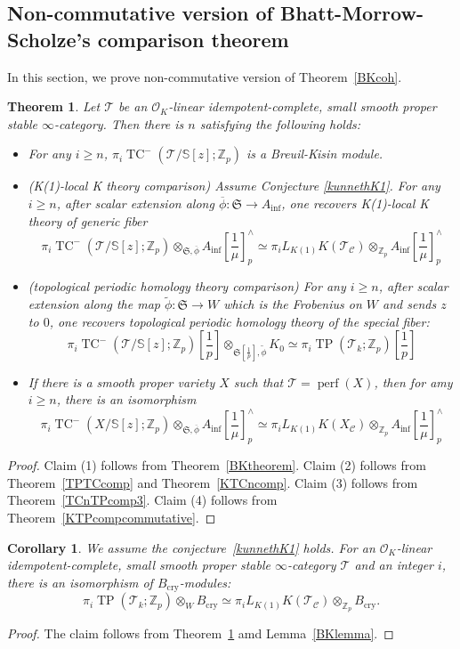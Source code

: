 \documentclass[11pt]{amsart}
\newcommand{\Z}{\mathbb{Z}}
\newcommand{\sO}{\mathcal{O}}
\newcommand{\sT}{\mathcal{T}}
\newcommand{\bS}{\mathbb{S}}
\newcommand{\perf}{\operatorname{perf}}
\newcommand{\LK}{{L_{K(1)}}}
\newcommand{\TP}{\operatorname{TP}}
\newcommand{\TCn}{\operatorname{TC}^{-}}
\newcommand{\ol}{\overline}
\newcommand{\Bcry}{B_{\operatorname{cry}}}
\newcommand{\Ainf}{A_{\operatorname{inf}}}
\newcommand{\Cu}{\mathcal{C}}
\newcommand{\mS}{\mathfrak{S}}
\newcounter{spec}
\newtheorem{thm}[lemma]{Theorem}
\newtheorem{cor}[lemma]{Corollary}
\theoremstyle{definition}
\theoremstyle{remark}
\numberwithin{equation}{section}
\begin{document}
\subsection{Non-commutative version of Bhatt-Morrow-Scholze's comparison theorem} In this section, we prove non-commutative version of Theorem~\ref{BKcoh}.
\begin{thm}\label{NCBMS}
  Let $\sT$ be an $\sO_K$-linear idempotent-complete, small smooth proper stable $\infty$-category. Then there is $n$ satisfying the following holds:
 \begin{itemize}
   \item[(1)] For any $i\geq n$, $\pi_i \TCn(\sT/\bS[z];\Z_p)$ is a Breuil-Kisin module.
   \item[(2)] (K(1)-local K theory comparison) Assume Conjecture \ref{kunnethK1}. For any $i\geq n$, after scalar extension along $\ol{\phi}:\mS\to \Ainf$, one recovers K(1)-local K theory of generic fiber
   \[
   \pi_i \TCn(\sT/\bS[z];\Z_p) \otimes_{\mS,\ol{\phi}} \Ainf[\frac{1}{\mu}]^{\wedge}_p \simeq \pi_i\LK K(\sT_{\Cu})\otimes_{\Z_p} \Ainf[\frac{1}{\mu}]^{\wedge}_p
   \]
   \item[(3)] (topological periodic homology theory comparison) For any $i\geq n$, after scalar extension along the map $\tilde{\phi}:\mS\to W$ which is the Frobenius on $W$ and sends $z$ to $0$, one recovers topological periodic homology theory of the special fiber:
  \[
   \pi_i \TCn(\sT/\bS[z];\Z_p)[\frac{1}{p}] \otimes_{\mS[\frac{1}{p}],\tilde{\phi}} K_0 \simeq \pi_i \TP(\sT_k;\Z_p)[\frac{1}{p}]
   \]
    \item[(4)] If there is a smooth proper variety $X$ such that $\sT=\perf(X)$, then for amy $i\geq n$, there is an isomorphism
   \[
    \pi_i \TCn(X/\bS[z];\Z_p) \otimes_{\mS,\ol{\phi}} \Ainf[\frac{1}{\mu}]^{\wedge}_p \simeq \pi_i\LK K(X_{\Cu})\otimes_{\Z_p} \Ainf[\frac{1}{\mu}]^{\wedge}_p
   \]
   \end{itemize}
\end{thm}
\begin{proof}
  Claim (1) follows from Theorem~\ref{BKtheorem}. Claim (2) follows from Theorem~\ref{TPTCcomp} and Theorem~\ref{KTCncomp}. Claim (3) follows from Theorem~\ref{TCnTPcomp3}. Claim (4) follows from Theorem~\ref{KTPcompcommutative}.
\end{proof}
\begin{cor}\label{Bcrycor}
  We assume the conjecture~\ref{kunnethK1} holds. For an $\sO_K$-linear idempotent-complete, small smooth proper stable $\infty$-category $\sT$ and an integer $i$, there is an isomorphism of $\Bcry$-modules:
\[
\pi_i\TP(\sT_k;\Z_p)\otimes_W \Bcry \simeq \pi_i L_{K(1)}K(\sT_\Cu)\otimes_{\Z_p} \Bcry.
\]
\end{cor}
\begin{proof}
  The claim follows from Theorem~\ref{NCBMS} amd Lemma~\ref{BKlemma}.
\end{proof}
\end{document}
